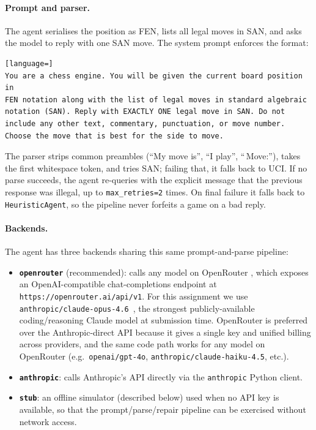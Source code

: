 \documentclass[11pt,a4paper]{article}
\begin{document}
\paragraph{Prompt and parser.} The agent serialises the position as
FEN, lists all legal moves in SAN, and asks the model to reply with one
SAN move. The system prompt enforces the format:
\begin{lstlisting}[language=]
You are a chess engine. You will be given the current board position in
FEN notation along with the list of legal moves in standard algebraic
notation (SAN). Reply with EXACTLY ONE legal move in SAN. Do not
include any other text, commentary, punctuation, or move number.
Choose the move that is best for the side to move.
\end{lstlisting}
The parser strips common preambles (``My move is'', ``I play'', ``\,Move:''),
takes the first whitespace token, and tries SAN; failing that, it
falls back to UCI. If no parse succeeds, the agent re-queries with
the explicit message that the previous response was illegal, up to
\texttt{max\_retries=2} times. On final failure it falls back to
\texttt{HeuristicAgent}, so the pipeline never forfeits a game on a
bad reply.

\paragraph{Backends.} The agent has three backends sharing this same
prompt-and-parse pipeline:
\begin{itemize}
  \item \textbf{\texttt{openrouter}} (recommended): calls any model on
    OpenRouter \cite{openrouter}, which exposes an OpenAI-compatible
    chat-completions endpoint at \texttt{https://openrouter.ai/api/v1}.
    For this assignment we use
    \texttt{anthropic/claude-opus-4.6}~\cite{claude-opus-46}, the
    strongest publicly-available coding/reasoning Claude model at
    submission time. OpenRouter is preferred over the
    Anthropic-direct API because it gives a single key and unified
    billing across providers, and the same code path works for any
    model on OpenRouter (e.g.\ \texttt{openai/gpt-4o},
    \texttt{anthropic/claude-haiku-4.5}, etc.).
  \item \textbf{\texttt{anthropic}}: calls Anthropic's API directly
    via the \texttt{anthropic} Python client.
  \item \textbf{\texttt{stub}}: an offline simulator (described below)
    used when no API key is available, so that the prompt/parse/repair
    pipeline can be exercised without network access.
\end{itemize}
\end{document}
